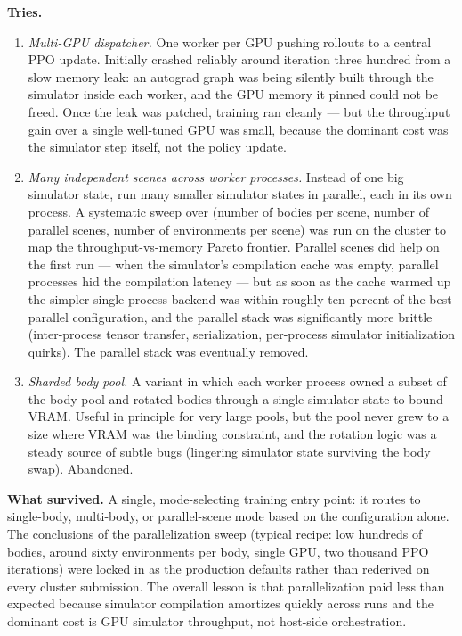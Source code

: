 \documentclass[letterpaper,10pt]{article}
\begin{document}
\textbf{Tries.}
\begin{enumerate}
    \item \emph{Multi-GPU dispatcher.} One worker per GPU pushing rollouts to a central PPO update. Initially crashed reliably around iteration three hundred from a slow memory leak: an autograd graph was being silently built through the simulator inside each worker, and the GPU memory it pinned could not be freed. Once the leak was patched, training ran cleanly --- but the throughput gain over a single well-tuned GPU was small, because the dominant cost was the simulator step itself, not the policy update.
    \item \emph{Many independent scenes across worker processes.} Instead of one big simulator state, run many smaller simulator states in parallel, each in its own process. A systematic sweep over (number of bodies per scene, number of parallel scenes, number of environments per scene) was run on the cluster to map the throughput-vs-memory Pareto frontier. Parallel scenes did help on the first run --- when the simulator's compilation cache was empty, parallel processes hid the compilation latency --- but as soon as the cache warmed up the simpler single-process backend was within roughly ten percent of the best parallel configuration, and the parallel stack was significantly more brittle (inter-process tensor transfer, serialization, per-process simulator initialization quirks). The parallel stack was eventually removed.
    \item \emph{Sharded body pool.} A variant in which each worker process owned a subset of the body pool and rotated bodies through a single simulator state to bound VRAM. Useful in principle for very large pools, but the pool never grew to a size where VRAM was the binding constraint, and the rotation logic was a steady source of subtle bugs (lingering simulator state surviving the body swap). Abandoned.
\end{enumerate}

\textbf{What survived.} A single, mode-selecting training entry point: it routes to single-body, multi-body, or parallel-scene mode based on the configuration alone. The conclusions of the parallelization sweep (typical recipe: low hundreds of bodies, around sixty environments per body, single GPU, two thousand PPO iterations) were locked in as the production defaults rather than rederived on every cluster submission. The overall lesson is that parallelization paid less than expected because simulator compilation amortizes quickly across runs and the dominant cost is GPU simulator throughput, not host-side orchestration.
\end{document}
